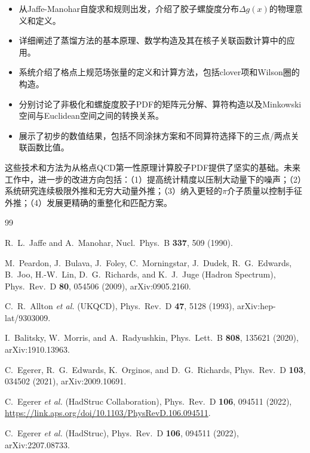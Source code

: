 \documentclass[12pt,a4paper]{ctexart}
\theoremstyle{definition}
\begin{document}
\begin{itemize}
    \item 从Jaffe-Manohar自旋求和规则出发，介绍了胶子螺旋度分布$\Delta g(x)$的物理意义和定义。
    \item 详细阐述了蒸馏方法的基本原理、数学构造及其在核子关联函数计算中的应用。
    \item 系统介绍了格点上规范场张量的定义和计算方法，包括clover项和Wilson圈的构造。
    \item 分别讨论了非极化和螺旋度胶子PDF的矩阵元分解、算符构造以及Minkowski空间与Euclidean空间之间的转换关系。
    \item 展示了初步的数值结果，包括不同涂抹方案和不同算符选择下的三点/两点关联函数比值。
\end{itemize}

这些技术和方法为从格点QCD第一性原理计算胶子PDF提供了坚实的基础。未来工作中，进一步的改进方向包括：（1）提高统计精度以压制大动量下的噪声；（2）系统研究连续极限外推和无穷大动量外推；（3）纳入更轻的$\pi$介子质量以控制手征外推；（4）发展更精确的重整化和匹配方案。

\begin{thebibliography}{99}

 R.~L.~Jaffe and A.~Manohar, Nucl.\ Phys.\ B \textbf{337}, 509 (1990).

 M.~Peardon, J.~Bulava, J.~Foley, C.~Morningstar, J.~Dudek, R.~G.~Edwards, B.~Joo, H.-W.~Lin, D.~G.~Richards, and K.~J.~Juge (Hadron Spectrum), Phys.\ Rev.\ D \textbf{80}, 054506 (2009), arXiv:0905.2160.

 C.~R.~Allton \textit{et al.} (UKQCD), Phys.\ Rev.\ D \textbf{47}, 5128 (1993), arXiv:hep-lat/9303009.

 I.~Balitsky, W.~Morris, and A.~Radyushkin, Phys.\ Lett.\ B \textbf{808}, 135621 (2020), arXiv:1910.13963.

 C.~Egerer, R.~G.~Edwards, K.~Orginos, and D.~G.~Richards, Phys.\ Rev.\ D \textbf{103}, 034502 (2021), arXiv:2009.10691.

 C.~Egerer \textit{et al.} (HadStruc Collaboration), Phys.\ Rev.\ D \textbf{106}, 094511 (2022), \url{https://link.aps.org/doi/10.1103/PhysRevD.106.094511}.

 C.~Egerer \textit{et al.} (HadStruc), Phys.\ Rev.\ D \textbf{106}, 094511 (2022), arXiv:2207.08733.

\end{thebibliography}
\end{document}
